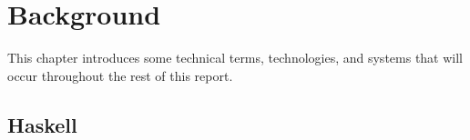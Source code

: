 \chapter{Background}\label{sec:background}
This chapter introduces some technical terms, technologies, and systems that
will occur throughout the rest of this report.
\section{Haskell}

